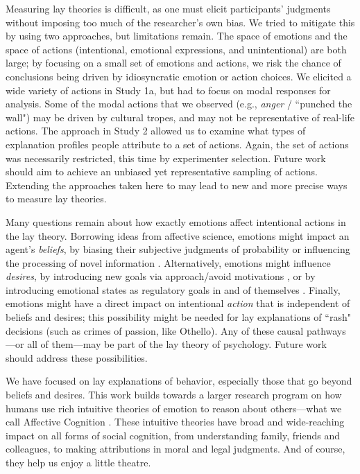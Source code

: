 \documentclass[10pt,letterpaper]{article}
\begin{document}
Measuring lay theories is difficult, as one must elicit participants' judgments without imposing too much of the researcher's own bias. We tried to mitigate this by using two approaches, but limitations remain. The space of emotions and the space of actions (intentional, emotional expressions, and unintentional) are both large; by focusing on a small set of emotions and actions, we risk the chance of conclusions being driven by idiosyncratic emotion or action choices.
We elicited a wide variety of actions in Study 1a, but had to focus on modal responses for analysis. Some of the modal actions that we observed (e.g., \textit{anger} / ``punched the wall") may be driven by cultural tropes, and may not be representative of real-life actions. The approach in Study 2 allowed us to examine what types of explanation profiles people attribute to a set of actions. Again, the set of actions was necessarily restricted, this time by experimenter selection. Future work should aim to achieve an unbiased yet representative sampling of actions. Extending the approaches taken here to may lead to new and more precise ways to measure lay theories.

Many questions remain about how exactly emotions affect intentional actions in the lay theory. Borrowing ideas from affective science, emotions might impact an agent's \textit{beliefs}, by biasing their subjective judgments of probability \cite{Wright1992} or influencing the processing of novel information \cite{Forgas1995}. Alternatively, emotions might influence \textit{desires}, by introducing new goals via approach/avoid motivations \cite{Carver2004}, or by introducing emotional states as regulatory goals in and of themselves \cite{Gross2006}. Finally, emotions might have a direct impact on intentional \textit{action} that is independent of beliefs and desires; this possibility might be needed for lay explanations of ``rash" decisions (such as crimes of passion, like Othello). 
Any of these causal pathways---or all of them---may be part of the lay theory of psychology. Future work should address these possibilities.




We have focused on lay explanations of behavior, especially those that go beyond beliefs and desires. This work builds towards a larger research program on how humans use rich intuitive theories of emotion to reason about others---what we call Affective Cognition \cite{Ong2015AffCog}. These intuitive theories have broad and wide-reaching impact on all forms of social cognition, from understanding family, friends and colleagues, to making attributions in moral and legal judgments. And of course, they help us enjoy a little theatre. 
\end{document}
